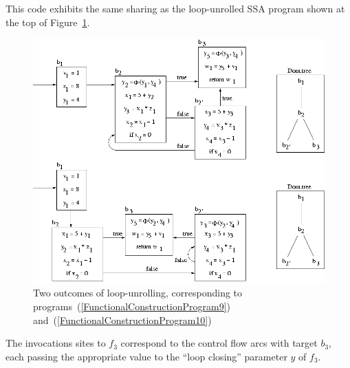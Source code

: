 This code exhibits the same sharing as the loop-unrolled SSA program
shown at the top of
Figure~\ref{fig:FunctionalCorrespondenceSSAofLoopClosedProgram}.
\begin{figure}
\begin{center}
\includegraphics[scale=0.6]{SSAConstructionExample4.png}
\end{center}
\caption{\label{fig:FunctionalCorrespondenceSSAofLoopClosedProgram} Two outcomes of loop-unrolling, corresponding to programs~(\ref{FunctionalConstructionProgram9}) and~(\ref{FunctionalConstructionProgram10})}
\end{figure}
The invocations sites to $f_3$ correspond to the control flow arcs
with target $b_3$, each passing the appropriate value to the ``loop
closing'' parameter $y$ of $f_3$.

